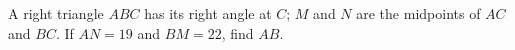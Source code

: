 A right triangle $ABC$ has its right angle at $C$; $M$ and $N$ are the midpoints of $AC$ and $BC$. If $AN=19$ and $BM=22$, find $AB$.
